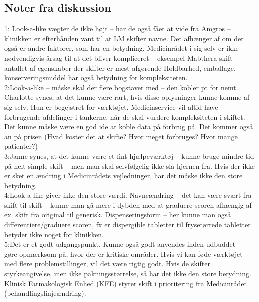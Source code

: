 \subsection{Noter fra diskussion}

1: Look-a-like vægter de ikke højt – har de også fået at vide fra Amgros – klinikken er efterhånden vant til at LM skifter navne. Det afhænger af om der også er andre faktorer, som har en betydning.
Medicinrådet i sig selv er ikke nødvendigvis årsag til at det bliver kompliceret – eksempel Mabthera-skift – antallet af egenskaber der skifter er mest afgørende
Holdbarhed, emballage, konserveringsmiddel har også betydning for kompleksiteten. \\
2:Look-a-like – måske skal der flere bogstaver med – den kobler pt for nemt. 
Charlotte synes, at det kunne være rart, hvis disse oplysninger kunne komme af sig selv. Hun er begejstret for værktøjet.
Medicinservice vil altid have forbrugende afdelinger i tankerne, når de skal vurdere kompleksiteten i skiftet. Det kunne måske være en god ide at koble data på forbrug på.
Det kommer også an på prisen (Hvad koster det at skifte? Hvor meget forbruges? Hvor mange patienter?)
\\3:Janne synes, at det kunne være et fint hjælpeværktøj – kunne bruge mindre tid på helt simple skift – men man skal selvfølgelig ikke slå hjernen fra. Hvis der ikke er sket en ændring i Medicinrådets vejledninger, har det måske ikke den store betydning.  \\
4:Look-a-like giver ikke den store værdi.
Navneændring – det kan være svært fra skift til skift – kunne man gå mere i dybden med at graduere scoren afhængig af ex. skift fra original til generisk.
Dispenseringsform – her kunne man også differentiere/graduere scoren, fx er dispergible tabletter til frysetørrede tabletter betyder ikke noget for klinikken. \\
5:Det er et godt udgangspunkt. Kunne også godt anvendes inden udbuddet – gøre opmærksom på, hvor der er kritiske områder.
Hvis vi kan føde værktøjet med flere problemstillinger, vil det være rigtig godt.
Hvis de skifter styrkeangivelse, men ikke pakningsstørrelse, så har det ikke den store betydning.
Klinisk Farmakologisk Enhed (KFE) styrer skift i prioritering fra Medicinrådet (behandlingslinjeændring).
